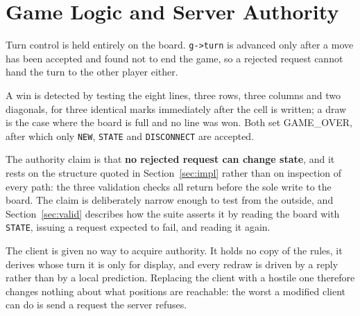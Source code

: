 \section{Game Logic and Server Authority}
\label{sec:authority}

Turn control is held entirely on the board. \texttt{g->turn} is advanced only
after a move has been accepted and found not to end the game, so a rejected
request cannot hand the turn to the other player either.

A win is detected by testing the eight lines, three rows, three columns and two
diagonals, for three identical marks immediately after the cell is written; a
draw is the case where the board is full and no line was won. Both set
GAME\_OVER, after which only \texttt{NEW}, \texttt{STATE} and
\texttt{DISCONNECT} are accepted.

The authority claim is that \textbf{no rejected request can change state}, and
it rests on the structure quoted in Section~\ref{sec:impl} rather than on
inspection of every path: the three validation checks all return before the
sole write to the board. The claim is deliberately narrow enough to test from
the outside, and Section~\ref{sec:valid} describes how the suite asserts it by
reading the board with \texttt{STATE}, issuing a request expected to fail, and
reading it again.

The client is given no way to acquire authority. It holds no copy of the rules,
it derives whose turn it is only for display, and every redraw is driven by a
reply rather than by a local prediction. Replacing the client with a hostile one
therefore changes nothing about what positions are reachable: the worst a
modified client can do is send a request the server refuses.
